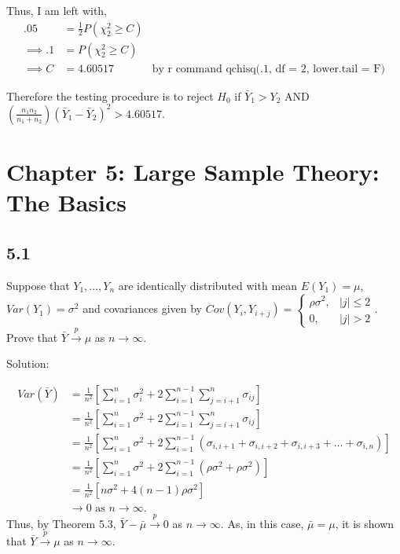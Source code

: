 \documentclass[
  letterpaper,
  DIV=11,
  numbers=noendperiod]{scrreprt}
\begin{document}
Thus, I am left with, \[ \begin{aligned}
.05 &=  \frac 1 2P(\chi^2_{2} \geq C) \\
\implies .1 &= P(\chi^2_{2} \geq C) \\
\implies C &= 4.60517 &\text{by r command qchisq(.1, df = 2, lower.tail = F)}
\end{aligned}\]

Therefore the testing procedure is to reject \(H_0\) if
\(\bar Y_1> Y_2\) AND
\(\left(\frac{n_1n_2}{n_1+n_2}\right)(\bar Y_1-\bar Y_2)^2 > 4.60517\).


\hypertarget{chapter-5-large-sample-theory-the-basics}{%
\chapter{Chapter 5: Large Sample Theory: The
Basics}\label{chapter-5-large-sample-theory-the-basics}}

\hypertarget{section-26}{%
\section{5.1}\label{section-26}}

Suppose that \(Y_1, \dots, Y_n\) are identically distributed with mean
\(E(Y_1)= \mu\), \(Var(Y_1)= \sigma^2\) and covariances given by
\(Cov(Y_{i},Y_{i+j})= \begin{cases} \rho\sigma^2, & |j| \leq2 \\ 0, &|j| >2 \end{cases}\).
Prove that \(\bar Y \overset{p}{\to} \mu\) as \(n \to \infty\).

Solution:

\[
\begin{aligned}
Var(\bar Y) &= \frac{1}{n^2}\left[\sum_{i=1}^n \sigma_i^2 + 2\sum_{i=1}^{n-1}\sum_{j=i+1}^{n} \sigma_{ij}\right] \\
&= \frac{1}{n^2}\left[\sum_{i=1}^n \sigma^2 + 2 \sum_{i=1}^{n-1}\sum_{j=i+1}^{n} \sigma_{ij}\right]\\
&= \frac{1}{n^2}\left[\sum_{i=1}^n \sigma^2 + 2 \sum_{i=1}^{n-1}\left(\sigma_{i,i+1} +\sigma_{i,i+2}+\sigma_{i,i+3} + \dots+\sigma_{i,n}\right)\right] \\
&= \frac{1}{n^2}\left[\sum_{i=1}^n \sigma^2 + 2 \sum_{i=1}^{n-1}\left(\rho \sigma^2 +\rho \sigma^2\right)\right] \\
&= \frac{1}{n^2}\left[n\sigma^2 + 4 (n-1) \rho \sigma^2\right] \\
& \to 0 \text{ as } n \to \infty.
\end{aligned}
\] Thus, by Theorem 5.3, \(\bar Y - \bar \mu \overset p \to 0\) as
\(n \to \infty\). As, in this case, \(\bar \mu = \mu\), it is shown that
\(\bar Y \overset p \to \mu\) as \(n \to \infty\).
\end{document}
